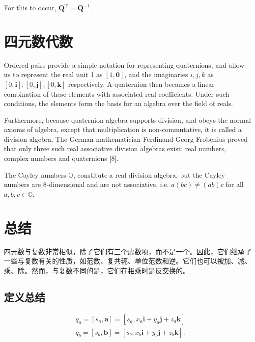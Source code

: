     For this to occur, $\mathbf{Q}^{\mathrm{T}}=\mathbf{Q}^{-1}$.

    \section{四元数代数}
    Ordered pairs provide a simple notation for representing quaternions, and allow us to represent the real unit 1 as $[1, \mathbf{0}]$, and the imaginaries $i, j, k$ as $[0, \mathbf{i}],[0, \mathbf{j}],[0, \mathbf{k}]$ respectively. A quaternion then becomes a linear combination of these elements with associated real coefficients. Under such conditions, the elements form the basis for an algebra over the field of reals.

    Furthermore, because quaternion algebra supports division, and obeys the normal axioms of algebra, except that multiplication is non-commutative, it is called a division algebra. The German mathematician Ferdinand Georg Frobenius proved that only three such real associative division algebras exist: real numbers, complex numbers and quaternions [8].

    The Cayley numbers $\mathbb{O}$, constitute a real division algebra, but the Cayley numbers are 8-dimensional and are not associative, i.e. $a(b c) \neq(a b) c$ for all $a, b, c \in \mathbb{O}$.

\section{总结}
四元数与复数非常相似，除了它们有三个虚数项，而不是一个。因此，它们继承了一些与复数有关的性质，如范数、复共轭、单位范数和逆。它们也可以被加、减、乘、除。然而，与复数不同的是，它们在相乘时是反交换的。

\subsection{定义总结}
\begin{tcolorbox}[breakable, enhanced,title = {四元数}]
    $$
        \begin{aligned}
             & q_{a}=\left[s_{a}, \mathbf{a}\right]=\left[s_{a}, x_{a} \mathbf{i}+y_{a} \mathbf{j}+z_{a} \mathbf{k}\right]   \\
             & q_{b}=\left[s_{b}, \mathbf{b}\right]=\left[s_{b}, x_{b} \mathbf{i}+y_{b} \mathbf{j}+z_{b} \mathbf{k}\right] .
        \end{aligned}
    $$
\end{tcolorbox}


